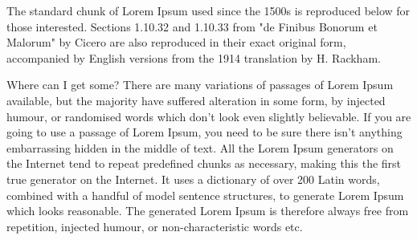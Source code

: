 \documentclass[a4paper,12pt]{book}
\begin{document}
{The standard chunk of Lorem Ipsum used since the 1500s is reproduced below for those interested. Sections 1.10.32 and 1.10.33 from "de Finibus Bonorum et Malorum" by Cicero are also reproduced in their exact original form, accompanied by English versions from the 1914 translation by H. Rackham.

Where can I get some?
There are many variations of passages of Lorem Ipsum available, but the majority have suffered alteration in some form, by injected humour, or randomised words which don't look even slightly believable. If you are going to use a passage of Lorem Ipsum, you need to be sure there isn't anything embarrassing hidden in the middle of text. All the Lorem Ipsum generators on the Internet tend to repeat predefined chunks as necessary, making this the first true generator on the Internet. It uses a dictionary of over 200 Latin words, combined with a handful of model sentence structures, to generate Lorem Ipsum which looks reasonable. The generated Lorem Ipsum is therefore always free from repetition, injected humour, or non-characteristic words etc.


}
\end{document}
